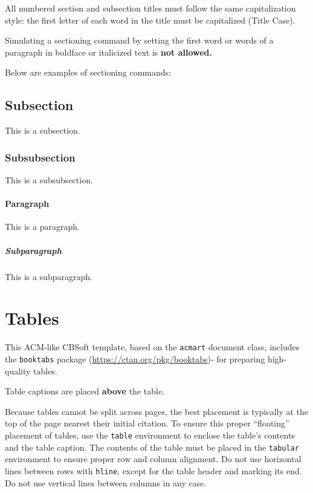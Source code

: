 All numbered section and subsection titles must follow the same capitalization style: the first letter of each word in the title must be capitalized (Title Case).

Simulating a sectioning command by setting the first word or words of a paragraph in boldface or italicized text is {\bfseries not allowed.}

Below are examples of sectioning commands:

\subsection{Subsection}
\label{sec:subsection}

This is a subsection.

\subsubsection{Subsubsection}
\label{sec:subsubsection}

This is a subsubsection.

\paragraph{Paragraph}

This is a paragraph.

\subparagraph{Subparagraph}

This is a subparagraph.

\section{Tables}

This ACM-like CBSoft template, based on the \verb|acmart| document class, includes the \verb|booktabs| package (\url{https://ctan.org/pkg/booktabs})- for preparing high-quality tables.

Table captions are placed \textbf{above} the table.

Because tables cannot be split across pages, the best placement is typically at the top of the page nearest their initial citation. To ensure this proper ``floating'' placement of tables, use the \texttt{table} environment to enclose the table's contents and the table caption. The contents of the table must be placed in the \texttt{tabular} environment to ensure proper row and column alignment. Do not use horizontal lines between rows with \texttt{hline}, except for the table header and marking its end. Do not use vertical lines between columns in any case.

